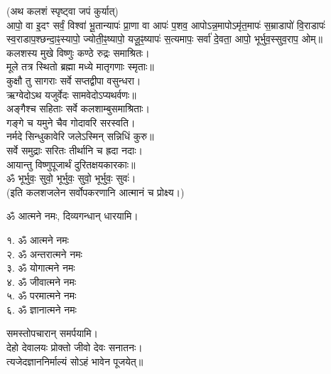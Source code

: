 (अथ कलशं स्पृष्ट्वा जपं कुर्यात्) \\
आपो॒ वा इ॒दꣳ सर्वं॒ विश्वा॑ भू॒तान्यापः॑ प्रा॒णा वा आपः॑ प॒शव॒ आपोऽन्न॒मापोऽमृ॑त॒मापः॑ स॒म्राडापो॑ वि॒राडापः॑ स्व॒राडाप॒श्छन्दा॒ꣴ॒स्यापो॒ ज्योती॒ꣴ॒ष्यापो॒ यजू॒ꣴ॒ष्यापः॑ स॒त्यमापः॒ सर्वा॑ दे॒वता॒ आपो॒ भूर्भुव॒स्सुव॒राप॒ ओम्॥\\
 
कलशस्य मुखे विष्णुः कण्ठे रुद्रः समाश्रितः।\\
मूले तत्र स्थितो ब्रह्मा मध्ये मातृगणाः स्मृताः॥\\
कुक्षौ तु सागराः सर्वे सप्तद्वीपा वसुन्धरा।\\
ऋग्वेदोऽथ यजुर्वेदः सामवेदोऽप्यथर्वणः॥\\
अङ्गैश्च सहिताः सर्वे कलशाम्बुसमाश्रिताः।\\
गङ्गे च यमुने चैव गोदावरि सरस्वति।\\
नर्मदे सिन्धुकावेरि जलेऽस्मिन् सन्निधिं कुरु॥\\
सर्वे समुद्राः सरितः तीर्थानि च ह्रदा नदाः।\\
आयान्तु विष्णुपूजार्थं दुरितक्षयकारकाः॥\\
ॐ भूर्भुवः॒ सुवो॒ भूर्भुवः॒ सुवो॒ भूर्भुवः॒ सुवः॑।\\

(इति कलशजलेन सर्वोपकरणानि आत्मानं च प्रोक्ष्य।)

ॐ आत्मने नमः, दिव्यगन्धान् धारयामि।
\begin{multicols}{2}
१. ॐ आत्मने नमः\\
२. ॐ अन्तरात्मने नमः\\
३. ॐ योगात्मने नमः\\
४. ॐ जीवात्मने नमः\\
५. ॐ परमात्मने नमः\\
६. ॐ ज्ञानात्मने नमः
\end{multicols}
समस्तोपचारान् समर्पयामि।\\

देहो देवालयः प्रोक्तो जीवो देवः सनातनः।\\
त्यजेदज्ञाननिर्माल्यं सोऽहं भावेन पूजयेत्॥\\

